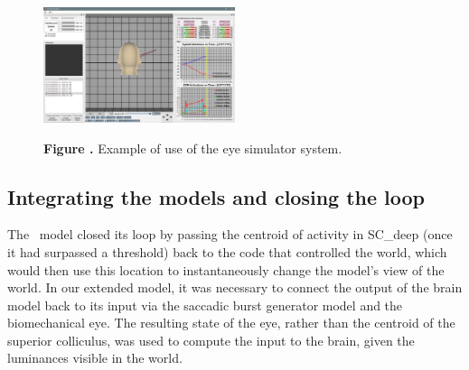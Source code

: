 \documentclass{frontiersSCNS}
\begin{document}
\begin{figure}[htb!]
\begin{center}
\includegraphics[width=0.5\textwidth]{./figures/Eye_sim2.png}
\end{center}
\textbf{\label{fig:eye_sim2} Figure .}
{Example of use of the eye simulator system.}
\end{figure}

\subsection{Integrating the models and closing the loop}
\label{sec:methods:integrating}

The \ccg~model closed its loop by passing the centroid of activity in
SC\_deep (once it had surpassed a threshold) back to the code that
controlled the world, which would then use this location to
instantaneously change the model's view of the world. In our extended
model, it was necessary to connect the output of the brain model back
to its input via the saccadic burst generator model and the
biomechanical eye. The resulting state of the eye, rather than the
centroid of the superior colliculus, was used to compute the input to
the brain, given the luminances visible in the world.
\end{document}
